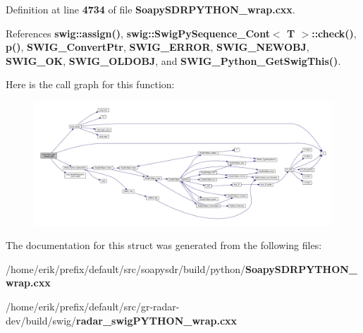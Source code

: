 Definition at line {\bf 4734} of file {\bf Soapy\+S\+D\+R\+P\+Y\+T\+H\+O\+N\+\_\+wrap.\+cxx}.



References {\bf swig\+::assign()}, {\bf swig\+::\+Swig\+Py\+Sequence\+\_\+\+Cont$<$ T $>$\+::check()}, {\bf p()}, {\bf S\+W\+I\+G\+\_\+\+Convert\+Ptr}, {\bf S\+W\+I\+G\+\_\+\+E\+R\+R\+OR}, {\bf S\+W\+I\+G\+\_\+\+N\+E\+W\+O\+BJ}, {\bf S\+W\+I\+G\+\_\+\+OK}, {\bf S\+W\+I\+G\+\_\+\+O\+L\+D\+O\+BJ}, and {\bf S\+W\+I\+G\+\_\+\+Python\+\_\+\+Get\+Swig\+This()}.



Here is the call graph for this function\+:
\nopagebreak
\begin{figure}[H]
\begin{center}
\leavevmode
\includegraphics[width=350pt]{d9/d27/structswig_1_1traits__asptr__stdseq_a20c63611de0e0b36a51bf9b1ff41af48_cgraph}
\end{center}
\end{figure}




The documentation for this struct was generated from the following files\+:\begin{DoxyCompactItemize}
\item 
/home/erik/prefix/default/src/soapysdr/build/python/{\bf Soapy\+S\+D\+R\+P\+Y\+T\+H\+O\+N\+\_\+wrap.\+cxx}\item 
/home/erik/prefix/default/src/gr-\/radar-\/dev/build/swig/{\bf radar\+\_\+swig\+P\+Y\+T\+H\+O\+N\+\_\+wrap.\+cxx}\end{DoxyCompactItemize}
